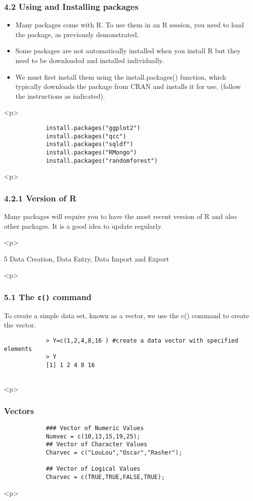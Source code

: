  		\frametitle{4.2 Using and Installing packages}
 		\begin{itemize}
 			\item Many packages come with R. To use them in an R session, you need to load the package, as
 			previously demonstrated.
 			\item Some packages are not automatically installed when you install R but they need to be downloaded
 			and installed individually. 
 			\item We must first install them using the install.packages()
 			function, which typically downloads the package from CRAN and installs it for use. (follow the
 			instructions as indicated).
 		\end{itemize}
<p>

 		\begin{framed}
 			\begin{verbatim}
 			install.packages("ggplot2")
 			install.packages("qcc")
 			install.packages("sqldf")
 			install.packages("RMongo")
 			install.packages("randomforest")
 			\end{verbatim}
 		\end{framed}
 		
<p>

 		\frametitle{4.2.1 Version of R}
 		Many packages will require you to have the most recent version of R and also other packages.
 		It is a good idea to update regularly.

<p>

 		5 Data Creation, Data Entry, Data Import and Export

<p>


 		\frametitle{5.1 The \texttt{c()} command}
 		To create a simple data set, known as a vector, we use the c() command to create the vector.
 		\begin{framed}
 			\begin{verbatim}
 			> Y=c(1,2,4,8,16 ) #create a data vector with specified elements
 			> Y
 			[1] 1 2 4 8 16
 			
 			\end{verbatim}
 		\end{framed}
 		
<p>

 		\frametitle{Vectors}
 		\begin{framed}
 			\begin{verbatim}
 			### Vector of Numeric Values
 			Numvec = c(10,13,15,19,25);
 			## Vector of Character Values
 			Charvec = c("LouLou","Oscar","Rasher");
 			
 			## Vector of Logical Values
 			Charvec = c(TRUE,TRUE,FALSE,TRUE);
 			\end{verbatim}
 		\end{framed}
<p>


